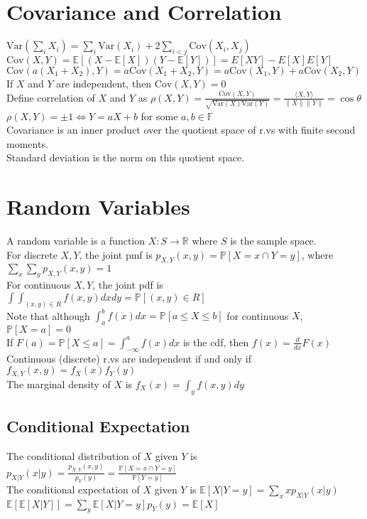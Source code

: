 \documentclass{article}
\renewcommand{\P}{\mathbb{P}}
\newcommand{\E}{\mathbb{E}}
\newcommand{\V}{\mbox{Var}}
\newcommand{\C}{\mbox{Cov}}
\begin{document}
\section{Covariance and Correlation}
$\V(\sum_{i} X_i) = \sum_{i} \V(X_i) + 2\sum\limits_{i < j}\C(X_i, X_j)$ \\
$\C(X, Y) = \E[(X-\E[X])(Y-\E[Y])] = E[XY] - E[X]E[Y]$ \\
$\C(a(X_1 + X_2), Y) = a\C(X_1+X_2, Y) = a\C(X_1, Y) + a\C(X_2, Y)$ \\
If $X$ and $Y$ are independent, then $\C(X, Y) = 0$ \\
Define correlation of $X$ and $Y$ as $\rho(X, Y) = \frac{\C(X, Y)}{\sqrt{\V(X)\V(Y)}} = \frac{\langle X, Y \rangle}{\|X\| \|Y\|} = \cos\theta$ \\
$\rho(X,Y) = \pm 1 \iff Y = aX + b$ for some $a, b \in \mathbb{F}$ \\
Covariance is an inner product over the quotient space of r.vs with finite second moments. \\
Standard deviation is the norm on this quotient space.


\section{Random Variables}
A random variable is a function $X: S \to \mathbb{R}$ where $S$ is the sample space.\\
For discrete $X, Y$, the joint pmf is $p_{X,Y}(x,y) = \P[X = x \cap Y = y]$, where $\sum_x \sum_y p_{X, Y}(x, y)=1$\\
For continuous $X, Y$, the joint pdf is $\int \int_{(x,y) \in R} f(x, y)dx dy = \P[(x, y) \in R]$ \\
Note that although $\int_a^b f(x)dx = \P[a \leq X \leq b]$ for continuous $X$, $\P[X=a] = 0$ \\
If $F(a) = \P[X\leq a] = \int_{-\infty}^a f(x)dx$ is the cdf, then $f(x) = \frac{d}{dx}F(x)$ \\
Continuous (discrete) r.vs are independent if and only if $f_{X,Y}(x,y) = f_X(x) f_Y(y) $ \\
The marginal density of $X$ is $f_X(x) = \int_y f(x,y)dy$ 


\subsection{Conditional Expectation}
The conditional distribution of $X$ given $Y$ is $p_{X|Y}(x|y) = \frac{p_{X,Y}(x,y)}{p_Y(y)} = \frac{\P[X=x \cap Y = y]}{\P[Y=y]}$ \\
The conditional expectation of $X$ given $Y$ is $\E[X|Y=y] = \sum_x x p_{X|Y}(x|y) $ \\
$\E[\E[X|Y]] = \sum_y\E[X|Y=y]p_Y(y) = \E[X]$
\end{document}

